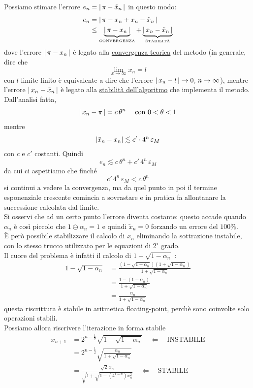 \documentclass[12pt]{article}
\DeclarePairedDelimiter{\abs}{\lvert}{\rvert}
\begin{document}
Possiamo stimare l'errore $ e_n=\abs{\,\pi - \Tilde{x}_n\,} $ in questo modo:
\[\begin{split}
    e_n & = \abs{\,\pi - x_n + x_n - \Tilde{x}_n\,} \\
    & \le \underbrace{\abs{\,\pi - x_{n}\,}}_{\text{\tiny{CONVERGENZA}}} + \underbrace{\abs{\,x_n - \Tilde{x}_n\,}}_{\text{\tiny{STABILITÀ}}}
\end{split}\]
dove l'errore $\abs{\,\pi - x_{n}\,}$ è legato alla \uline{convergenza teorica} del metodo (in generale, dire che
\[\lim_{x\to \infty} x_{n} = l\]
con $l$ limite finito è equivalente a dire che l'errore $\abs{\,x_n - l\,}\to 0,\, n \to \infty $), mentre l'errore $\abs{\,x_n - \Tilde{x}_n\,}$ è legato alla \uline{stabilità dell'algoritmo} che implementa il metodo. \\
Dall'analisi fatta, 
\[\abs{\,x_n - \pi\,} = c\,\theta^{n} \quad \text{ con } 0<\theta<1\] mentre 
\[\abs{\Tilde{x}_n - x_n} \lesssim c' \cdot 4^n\,\varepsilon_{M}\] 
con $c$ e $c'$ costanti. Quindi 
\[ e_n \lesssim c\,\theta^n + c' \, 4^n\,\varepsilon_{M} \]
da cui ci aspettiamo che finché 
\[c'\,4^{n}\,\varepsilon_{M}<c\,\theta^{n}\] 
si continui a vedere la convergenza, ma da quel punto in poi il termine esponenziale crescente comincia a sovrastare e in pratica fa allontanare la successione calcolata dal limite. \\
Si osservi che ad un certo punto l'errore diventa costante: questo accade quando $\alpha_n$ è così piccolo che $1 \ominus \alpha_n = 1$ e quindi $\tilde{x}_n=0$ forzando un errore del $100\%$.\\
È però possibile stabilizzare il calcolo di $x_n$ eliminando la sottrazione instabile, con lo stesso trucco utilizzato per le equazioni di $2^\circ$ grado. \\
Il cuore del problema è infatti il calcolo di  $1-\sqrt{1-\alpha_{n}}$ :
\[\begin{split}
    1-\sqrt{1-\alpha_{n}} & = \frac{(1-\sqrt{1-\alpha_n})(1+\sqrt{1-\alpha_n})}{1+\sqrt{1-\alpha_n}} \\
    & = \frac{1-(1-\alpha_n)}{1+\sqrt{1-\alpha_n}} \\ 
    & = \frac{\alpha_n}{1+\sqrt{1-\alpha_n}}
\end{split}\]
questa riscrittura è stabile in aritmetica floating-point, perchè sono coinvolte solo operazioni stabili.\\
Possiamo allora riscrivere l'iterazione in forma stabile 
\[\begin{split}
    x_{n+1} & = 2^{n-\frac{1}{2}}\sqrt{1-\sqrt{1-\alpha_n}} \quad \Longleftarrow \quad \text{INSTABILE} \\
    & = 2^{n-\frac{1}{2}}\sqrt{\frac{\alpha_n}{1+\sqrt{1-\alpha_n}}} \\
    & = \frac{\sqrt{2}\,x_n}{\sqrt{1+\sqrt{1-(4^{1-n})x_{n}^{2}}}} \quad \Longleftarrow \quad \text{STABILE}
\end{split}\]
\end{document}

